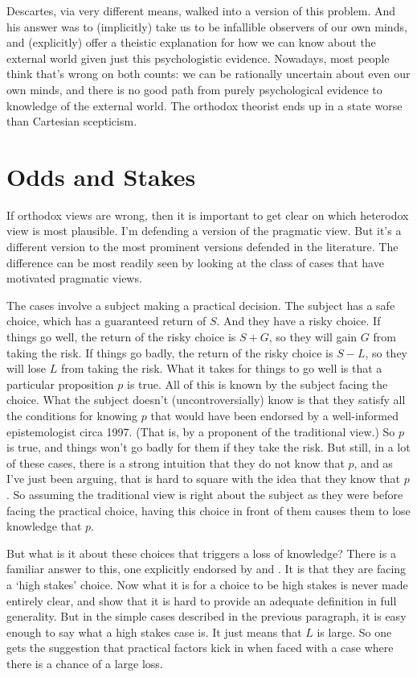 \documentclass[11pt,]{book}
\begin{document}
Descartes, via very different means, walked into a version of this problem. And his answer was to (implicitly) take us to be infallible observers of our own minds, and (explicitly) offer a theistic explanation for how we can know about the external world given just this psychologistic evidence. Nowadays, most people think that's wrong on both counts: we can be rationally uncertain about even our own minds, and there is no good path from purely psychological evidence to knowledge of the external world. The orthodox theorist ends up in a state worse than Cartesian scepticism.

\hypertarget{oddsandstakes}{%
\section{Odds and Stakes}\label{oddsandstakes}}

If orthodox views are wrong, then it is important to get clear on which heterodox view is most plausible. I'm defending a version of the pragmatic view. But it's a different version to the most prominent versions defended in the literature. The difference can be most readily seen by looking at the class of cases that have motivated pragmatic views.

The cases involve a subject making a practical decision. The subject has a safe choice, which has a guaranteed return of \(S\). And they have a risky choice. If things go well, the return of the risky choice is \(S + G\), so they will gain \(G\) from taking the risk. If things go badly, the return of the risky choice is \(S - L\), so they will lose \(L\) from taking the risk. What it takes for things to go well is that a particular proposition \(p\) is true. All of this is known by the subject facing the choice. What the subject doesn't (uncontroversially) know is that they satisfy all the conditions for knowing \(p\) that would have been endorsed by a well-informed epistemologist circa 1997. (That is, by a proponent of the traditional view.) So \(p\) is true, and things won't go badly for them if they take the risk. But still, in a lot of these cases, there is a strong intuition that they do not know that \(p\), and as I've just been arguing, that is hard to square with the idea that they know that \(p\). So assuming the traditional view is right about the subject as they were before facing the practical choice, having this choice in front of them causes them to lose knowledge that \(p\).

But what is it about these choices that triggers a loss of knowledge? There is a familiar answer to this, one explicitly endorsed by \citet{Hawthorne2004} and \citet{Stalney2005}. It is that they are facing a `high stakes' choice. Now what it is for a choice to be high stakes is never made entirely clear, and \citet{AndersonHawthorne2019a} show that it is hard to provide an adequate definition in full generality. But in the simple cases described in the previous paragraph, it is easy enough to say what a high stakes case is. It just means that \(L\) is large. So one gets the suggestion that practical factors kick in when faced with a case where there is a chance of a large loss.
\end{document}
